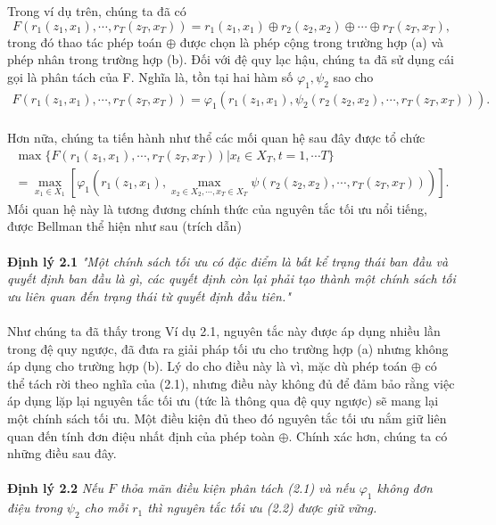\documentclass[12pt,a4paper]{report}
\begin{document}
		Trong ví dụ trên, chúng ta đã có $$F(r_1(z_1,x_1),\cdots, r_T(z_T, x_T)) = r_1(z_1, x_1) \oplus r_2(z_2, x_2) \oplus \cdots \oplus r_T(z_T, x_T), $$
		trong đó thao tác phép toán $\oplus$ được chọn là phép cộng trong trường hợp (a) và phép nhân trong trường hợp (b). Đối với đệ quy lạc hậu, chúng ta đã sử dụng cái gọi là phân tách của F. Nghĩa là, tồn tại hai hàm số $\varphi_1, \psi_2$ sao cho
		\begin{eqnarray}
		F(r_1(z_1,x_1), \cdots, r_T(z_T, x_T))   = \varphi_1(r_1(z_1, x_1), \psi_2(r_2(z_2, x_2), \cdots, r_T(z_T, x_T))).
		\end{eqnarray}
		\\
		\noindent
		Hơn nữa, chúng ta tiến hành như thể các mối quan hệ sau đây được tổ chức \begin{eqnarray}
			\max\{F(r_1(z_1, x_1),\cdots, r_T(z_T, x_T)) | x_t \in X_T, t = 1, \cdots T\}  \\ \nonumber = \max_{x_1 \in X_1}[\varphi_1(r_1(z_1, x_1), \max_{x_2 \in X_2, \cdots, x_T \in X_T}\psi(r_2(z_2, x_2), \cdots, r_T(z_T, x_T)))].
		\end{eqnarray}  
		Mối quan hệ này là tương đương chính thức của nguyên tắc tối ưu nổi tiếng, được Bellman thể hiện như sau (trích dẫn)
		\\\\
		\textbf{Định lý 2.1} \textit{"Một chính sách tối ưu có đặc điểm là bất kể trạng thái ban đầu và quyết định ban đầu là gì, các quyết định còn lại phải tạo thành một chính sách tối ưu liên quan đến trạng thái từ quyết định đầu tiên."}
		\\\\		
		Như chúng ta đã thấy trong Ví dụ 2.1, nguyên tắc này được áp dụng nhiều lần trong đệ quy ngược, đã đưa ra giải pháp tối ưu cho trường hợp (a) nhưng không áp dụng cho trường hợp (b). Lý do cho điều này là vì, mặc dù phép toán $\oplus$ có thể tách rời theo nghĩa của (2.1), nhưng điều này không đủ để đảm bảo rằng việc áp dụng lặp lại nguyên tắc tối ưu (tức là thông qua đệ quy ngược) sẽ mang lại một chính sách tối ưu. Một điều kiện đủ theo đó nguyên tắc tối ưu nắm giữ liên quan đến tính đơn điệu nhất định của phép toàn $\oplus$. Chính xác hơn, chúng ta có những điều sau đây.\\\\
		\textbf{Định lý 2.2} \textit{Nếu $F$ thỏa mãn điều kiện phân tách (2.1) và nếu $\varphi_1$ không đơn điệu trong $\psi_2$ cho mỗi $r_1$ thì nguyên tắc tối ưu (2.2) được giữ vững.}\\\\
\end{document}
